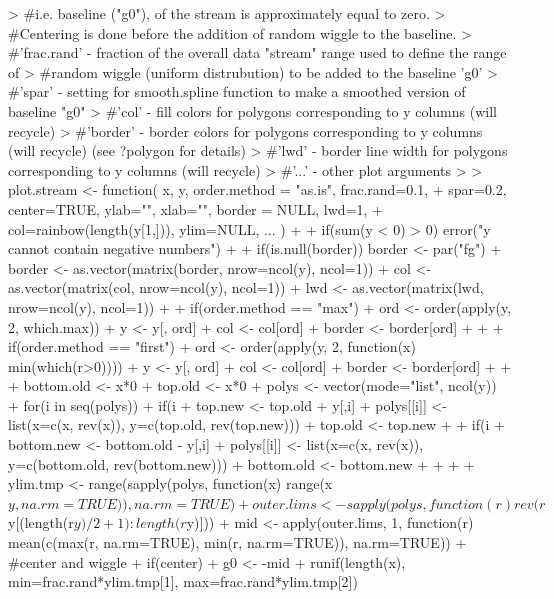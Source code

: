\documentclass[11pt]{article}
\begin{document}
\begin{Schunk}
\begin{Sinput}
{> #i.e. baseline ("g0"), of the stream is approximately equal to zero.
> #Centering is done before the addition of random wiggle to the baseline.
> #'frac.rand' - fraction of the overall data "stream" range used to define the range of
> #random wiggle (uniform distrubution) to be added to the baseline 'g0'
> #'spar' - setting for smooth.spline function to make a smoothed version of baseline "g0"
> #'col' - fill colors for polygons corresponding to y columns (will recycle)
> #'border' - border colors for polygons corresponding to y columns (will recycle) (see ?polygon for details)
> #'lwd' - border line width for polygons corresponding to y columns (will recycle)
> #'...' - other plot arguments
>  
> plot.stream <- function( x, y, order.method = "as.is", frac.rand=0.1,
+                         spar=0.2, center=TRUE, ylab="", xlab="", border = NULL, lwd=1,
+                         col=rainbow(length(y[1,])), ylim=NULL, ...  ){
+     
+     if(sum(y < 0) > 0) error("y cannot contain negative numbers")
+     
+     if(is.null(border)) border <- par("fg")
+     border <- as.vector(matrix(border, nrow=ncol(y), ncol=1))
+     col <- as.vector(matrix(col, nrow=ncol(y), ncol=1))
+     lwd <- as.vector(matrix(lwd, nrow=ncol(y), ncol=1))
+     
+     if(order.method == "max") {
+         ord <- order(apply(y, 2, which.max))
+         y <- y[, ord]
+         col <- col[ord]
+         border <- border[ord]
+     }
+     
+     if(order.method == "first") {
+ 	ord <- order(apply(y, 2, function(x) min(which(r>0))))
+         y <- y[, ord]
+         col <- col[ord]
+         border <- border[ord]
+     }
+     
+     bottom.old <- x*0
+     top.old <- x*0
+     polys <- vector(mode="list", ncol(y))
+     for(i in seq(polys)){
+         if(i %
+             top.new <- top.old + y[,i]
+             polys[[i]] <- list(x=c(x, rev(x)), y=c(top.old, rev(top.new)))
+             top.old <- top.new
+         }
+         if(i %
+             bottom.new <- bottom.old - y[,i]
+             polys[[i]] <- list(x=c(x, rev(x)), y=c(bottom.old, rev(bottom.new)))
+             bottom.old <- bottom.new
+         }
+ }
+  
+     ylim.tmp <- range(sapply(polys, function(x) range(x$y, na.rm=TRUE)), na.rm=TRUE)
+     outer.lims <- sapply(polys, function(r) rev(r$y[(length(r$y)/2+1):length(r$y)]))
+     mid <- apply(outer.lims, 1, function(r) mean(c(max(r, na.rm=TRUE), min(r, na.rm=TRUE)), na.rm=TRUE))
+                                         #center and wiggle
+     if(center) {
+         g0 <- -mid + runif(length(x), min=frac.rand*ylim.tmp[1], max=frac.rand*ylim.tmp[2])
}
\end{Sinput}
\end{Schunk}
\end{document}
